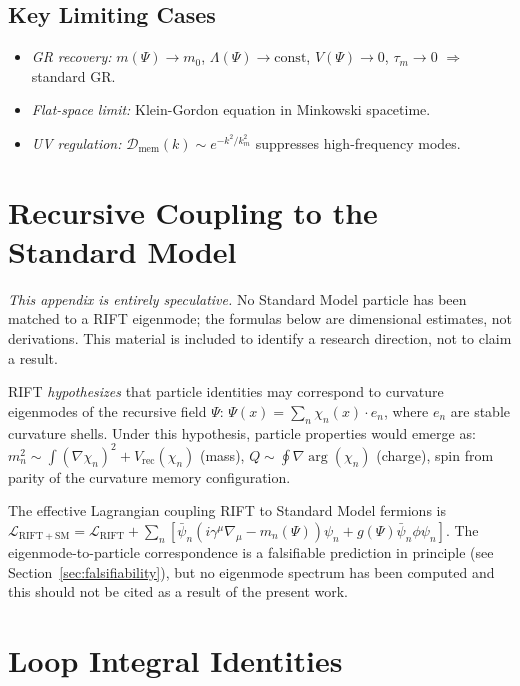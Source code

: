 \documentclass[12pt,a4paper]{article}
\begin{document}
\subsection{Key Limiting Cases}

\begin{itemize}
  \item \emph{GR recovery:} $m(\Psi)\to m_0$, $\Lambda(\Psi)\to\mathrm{const}$, $V(\Psi)\to 0$, $\tau_m\to 0$ $\Rightarrow$ standard GR.
  \item \emph{Flat-space limit:} Klein-Gordon equation in Minkowski spacetime.
  \item \emph{UV regulation:} $\mathcal{D}_{\mathrm{mem}}(k) \sim e^{-k^2/k_m^2}$ suppresses high-frequency modes.
\end{itemize}

\section{Recursive Coupling to the Standard Model}
\label{app:SM}

\emph{This appendix is entirely speculative.}  No Standard Model particle has
been matched to a RIFT eigenmode; the formulas below are dimensional estimates,
not derivations.  This material is included to identify a research direction,
not to claim a result.

RIFT \emph{hypothesizes} that particle identities may correspond to curvature
eigenmodes of the recursive field $\Psi$:
$\Psi(x) = \sum_n \chi_n(x)\cdot e_n$,
where $e_n$ are stable curvature shells. Under this hypothesis, particle
properties would emerge as:
$m_n^2 \sim \int (\nabla\chi_n)^2 + V_{\mathrm{rec}}(\chi_n)$ (mass),
$Q \sim \oint \nabla\arg(\chi_n)$ (charge),
spin from parity of the curvature memory configuration.

The effective Lagrangian coupling RIFT to Standard Model fermions is
$\mathcal{L}_{\mathrm{RIFT+SM}} = \mathcal{L}_{\mathrm{RIFT}} + \sum_n[\bar\psi_n(i\gamma^\mu\nabla_\mu - m_n(\Psi))\psi_n + g(\Psi)\bar\psi_n\phi\psi_n]$.
The eigenmode-to-particle correspondence is a falsifiable prediction in principle
(see Section~\ref{sec:falsifiability}), but no eigenmode spectrum has been
computed and this should not be cited as a result of the present work.

\section{Loop Integral Identities}
\label{app:loop_integrals}
\end{document}
